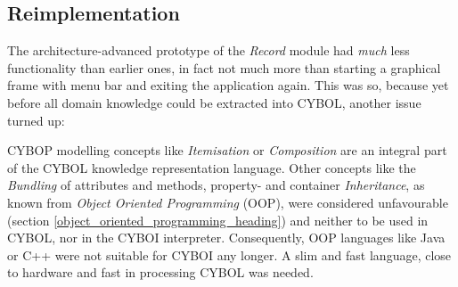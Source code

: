%
%
%
%
%
%
%

\subsection{Reimplementation}
\label{reimplementation_heading}

The architecture-advanced prototype of the \emph{Record} module had \emph{much}
less functionality than earlier ones, in fact not much more than starting a
graphical frame with menu bar and exiting the application again. This was so,
because yet before all domain knowledge could be extracted into CYBOL, another
issue turned up:

CYBOP modelling concepts like \emph{Itemisation} or \emph{Composition} are an
integral part of the CYBOL knowledge representation language. Other concepts
like the \emph{Bundling} of attributes and methods, property- and container
\emph{Inheritance}, as known from \emph{Object Oriented Programming} (OOP),
were considered unfavourable (section \ref{object_oriented_programming_heading})
and neither to be used in CYBOL, nor in the CYBOI interpreter. Consequently,
OOP languages like Java or C++ were not suitable for CYBOI any longer. A slim
and fast language, close to hardware and fast in processing CYBOL was needed.

